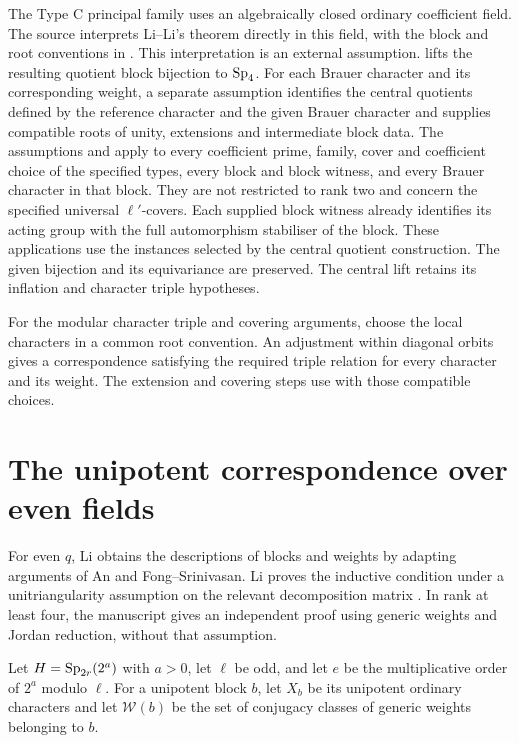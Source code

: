 \begin{implementation}
The Type C principal family uses an algebraically closed ordinary
coefficient field. The source  interprets Li--Li's
theorem directly in this field, with the block and root conventions in
. This interpretation is an external assumption.
 lifts the resulting quotient
block bijection to $\operatorname{Sp}_4$. For each Brauer character and its corresponding
weight, a separate assumption identifies the central
quotients defined by the reference character and the given Brauer character
and supplies compatible roots of unity, extensions and intermediate block
data. The assumptions  and
 apply to every coefficient
prime, family, cover and coefficient choice of the specified types,
every block and block witness, and every Brauer character in that block.
They are not restricted to rank two and concern the specified universal
$\ell'$-covers. Each supplied block witness already identifies its acting
group with the full automorphism stabiliser of the block.
These applications use the instances selected by the central quotient
construction. The given bijection and its equivariance are preserved.
The central lift retains its inflation and character triple hypotheses.
\end{implementation}

For the modular character triple and covering arguments, choose the local
characters in a common root convention. An adjustment within diagonal orbits
gives a correspondence satisfying the required triple relation for every
character and its weight. The extension and covering steps use
\cite[Proposition~3.4, Remark~3.5 and Corollary~4.6]{FengMalle2022} with
those compatible choices.

\section{The unipotent correspondence over even fields}

For even $q$, Li \cite[Section~6]{Li2021} obtains the descriptions of
blocks and weights by adapting arguments of An and Fong--Srinivasan.
Li proves the inductive condition under a unitriangularity assumption on the relevant decomposition matrix \cite[Theorem~3]{Li2021}. In rank at least four, the manuscript
gives an independent proof using generic weights and Jordan reduction,
without that assumption.

Let $H=\operatorname{Sp}_{2r}(2^a)$ with $a>0$, let $\ell$ be odd, and let $e$ be the
multiplicative order of $2^a$ modulo $\ell$. For a unipotent block $b$, let
$X_b$ be its unipotent ordinary characters and let $\mathcal W(b)$ be the
set of conjugacy classes of generic weights belonging to $b$.

